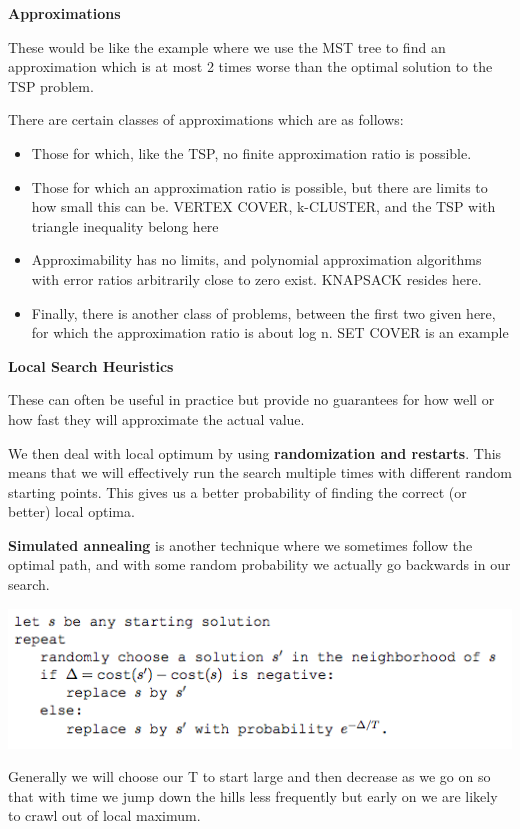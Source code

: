 \documentclass[landscape]{article}
\begin{document}
\begin{multicols}{3}
\textbf{Approximations}


These would be like the example where we use the MST tree to find an approximation which is at most 2 times worse than the optimal solution to the TSP problem.

There are certain classes of approximations which are as follows:

\begin{itemize}
	\item Those for which, like the TSP, no finite approximation ratio is possible.
	\item Those for which an approximation ratio is possible, but there are limits to how small
this can be. VERTEX COVER, k-CLUSTER, and the TSP with triangle inequality belong here
	\item Approximability has no limits, and polynomial approximation algorithms with error ratios arbitrarily close to zero exist. KNAPSACK resides here.
	\item Finally, there is another class of problems, between the first two given here, for which
the approximation ratio is about log n. SET COVER is an example
\end{itemize}

\textbf{Local Search Heuristics}

These can often be useful in practice but provide no guarantees for how well or how fast they will approximate the actual value.

We then deal with local optimum by using \textbf{randomization and restarts}.
This means that we will effectively run the search multiple times with different random starting points.
This gives us a better probability of finding the correct (or better) local optima.

\textbf{Simulated annealing} is another technique where we sometimes follow the optimal path, and with some random probability we actually go backwards in our search.

\includegraphics[scale=0.45]{annealing}

Generally we will choose our T to start large and then decrease as we go on so that with time we jump down the hills less frequently but early on we are likely to crawl out of local maximum.



\end{multicols}
\end{document}
